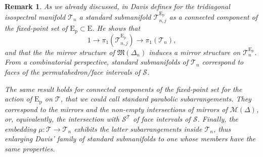 \documentclass[reqno]{amsart}
\newcommand{\p}{\mathrm{p}}
\newcommand{\cM}{\mathcal{M}}
\newcommand{\cS}{\mathcal{S}}
\newcommand{\cT}{\mathcal{T}}
\newcommand{\E}{\mathrm{E}}
\newtheorem{remark}[theorem]{Remark}
\begin{document}
\begin{remark}\label{rem:David}
As we already discussed, in \cite[Section 7]{Da2} Davis defines for the tridiagonal isospectral manifold $\cT_n$ a standard submanifold $\cT_{n,j}^{\E_\p}$ as a connected component of the fixed-point set of $\E_\p\subset\E$.  He shows that
\[1\to \pi_1(\cT_{n,j}^{\E_\p})\to \pi_1(\cT_n),\]
and that the the mirror structure of $\mathfrak{M}(\Delta_n)$ induces a mirror structure on $\cT_n^{\E_\p}$.
From a combinatorial perspective, standard submanifolds of $\cT_n$ correspond to faces of the permutahedron/face intervals of $\cS$.

The same result holds for connected components of the fixed-point set for the action of $\E_\p$ on $\cT$, that we could call standard parabolic subarrangements. They correspond to the mirrors and the non-empty intersections of mirrors of $\cM(\Delta)$, or, equivalently, the intersection with $\cS^\cT$ of face intervals of $\cS$. Finally,
the embedding $\mu:\cT\to \cT_n$ exhibits the latter subarrangements inside $\cT_n$, thus enlarging Davis' family of  standard submanifolds to one whose members have the same properties.
\end{remark}
\end{document}
